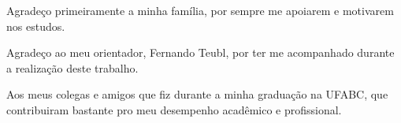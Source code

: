 \begin{agradecimentos}

Agradeço primeiramente a minha família, por sempre me apoiarem e motivarem nos estudos.

Agradeço ao meu orientador, Fernando Teubl, por ter me acompanhado durante a realização deste trabalho.

Aos meus colegas e amigos que fiz durante a minha graduação na UFABC, que contribuiram bastante pro meu desempenho acadêmico e profissional.

\end{agradecimentos}
